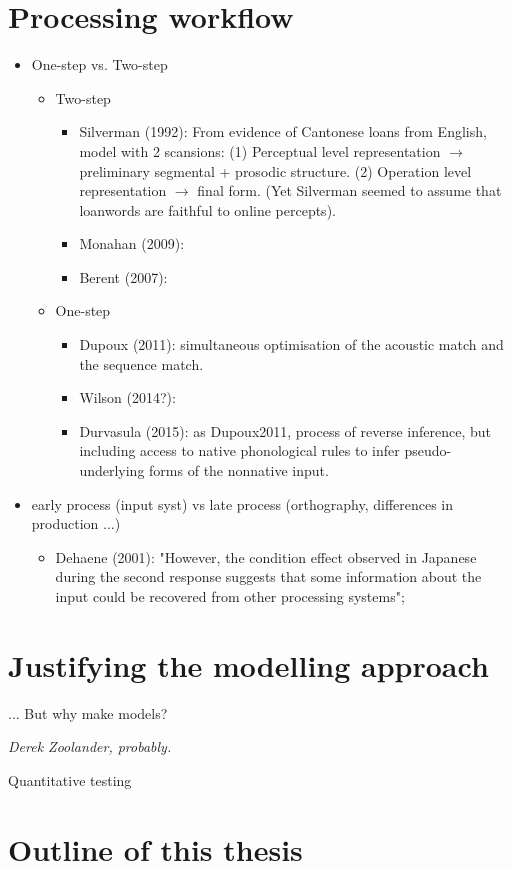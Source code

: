 \section{Processing workflow}
\begin{itemize}
\item One-step vs. Two-step
  \begin{itemize}
  \item Two-step
      \begin{itemize}
        \item Silverman (1992): From evidence of Cantonese loans from English, model with 2 scansions: (1) Perceptual level representation $\rightarrow$ preliminary segmental + prosodic structure. (2) Operation level representation $\rightarrow$ final form. (Yet Silverman seemed to assume that loanwords are faithful to online percepts).
        \item Monahan (2009):
        \item Berent (2007): 
      \end{itemize}
  \item One-step
      \begin{itemize}
         \item Dupoux (2011): simultaneous optimisation of the acoustic match and the sequence match.
         \item Wilson (2014?):
         \item Durvasula (2015): as Dupoux2011, process of reverse inference, but including access to native phonological rules to infer pseudo-underlying forms of the nonnative input.
      \end{itemize}  
  \end{itemize}
\item early process (input syst) vs late process (orthography, differences in production ...)
  \begin{itemize}
     \item Dehaene (2001): "However, the condition effect observed in Japanese during the second response suggests that some information about the input could be recovered from other processing systems";
  \end{itemize}  
\end{itemize}
    
\section{Justifying the modelling approach}
\epigraph{... But why make models?}{\textit{Derek Zoolander, probably.}}
Quantitative testing $~$

\section{Outline of this thesis}

